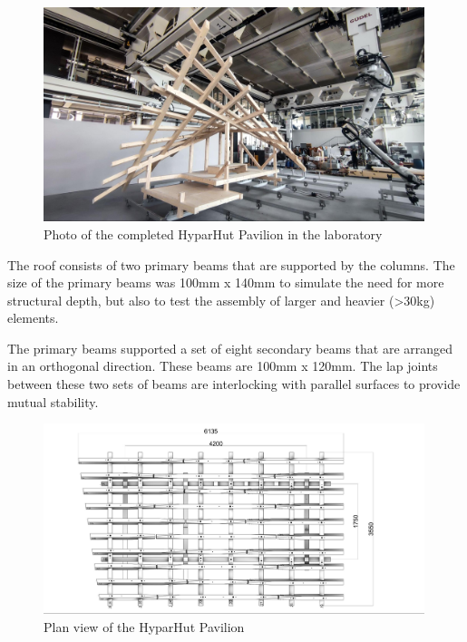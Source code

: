 \begin{figure}[!h]
    \centering
    \includegraphics[width=0.99\textwidth]{images/7b/img01.jpg}
    \caption{Photo of the completed HyparHut Pavilion in the laboratory}
    \label{fig:completed-hyparhut-pavilion}
\end{figure}


The roof consists of two primary beams that are supported by the columns. The size of the primary beams was 100mm x 140mm to simulate the need for more structural depth, but also to test the assembly of larger and heavier (>30kg) elements.

The primary beams supported a set of eight secondary beams that are arranged in an orthogonal direction. These beams are 100mm x 120mm. The lap joints between these two sets of beams are interlocking with parallel surfaces to provide mutual stability. 

\begin{figure}[!h]
    \centering
    \includegraphics[width=0.99\textwidth]{images/7b/img02.jpg}
    \caption{Plan view of the HyparHut Pavilion}
    \label{fig:plan-view-of-the-hyparhut-pavilion}
\end{figure}


